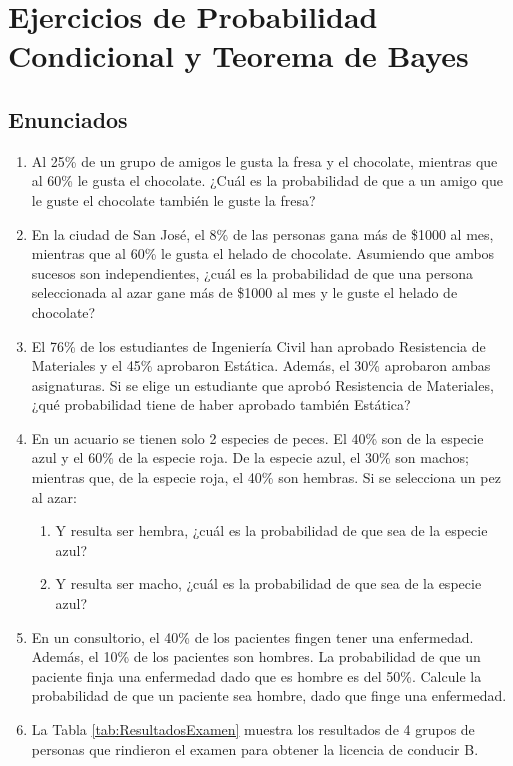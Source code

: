 \documentclass[12pt, letterpaper]{article}
\begin{document}
\newpage

\section{Ejercicios de Probabilidad Condicional y Teorema de Bayes}
\subsection{Enunciados}
\begin{enumerate}
	\item Al 25\% de un grupo de amigos le gusta la fresa y el chocolate, mientras que al 60\% le gusta el chocolate. ¿Cuál es la probabilidad de que a un amigo que le guste el chocolate también le guste la fresa?
	\item En la ciudad de San José, el 8\% de las personas gana más de \$1000 al mes, mientras que al 60\% le gusta el helado de chocolate. Asumiendo que ambos sucesos son independientes, ¿cuál es la probabilidad de que una persona seleccionada al azar gane más de \$1000 al mes y le guste el helado de chocolate?
	\item El 76\% de los estudiantes de Ingeniería Civil han aprobado Resistencia de Materiales y el 45\% aprobaron Estática. Además, el 30\% aprobaron ambas asignaturas. Si se elige un estudiante que aprobó Resistencia de Materiales, ¿qué probabilidad tiene de haber aprobado también Estática?
	\item En un acuario se tienen solo 2 especies de peces. El 40\% son de la especie azul y el 60\% de la especie roja. De la especie azul, el 30\% son machos; mientras que, de la especie roja, el 40\% son hembras. Si se selecciona un pez al azar:
	      \begin{enumerate}
		      \item Y resulta ser hembra, ¿cuál es la probabilidad de que sea de la especie azul?
		      \item Y resulta ser macho, ¿cuál es la probabilidad de que sea de la especie azul?
	      \end{enumerate}
	\item En un consultorio, el 40\% de los pacientes fingen tener una enfermedad. Además, el 10\% de los pacientes son hombres. La probabilidad de que un paciente finja una enfermedad dado que es hombre es del 50\%. Calcule la probabilidad de que un paciente sea hombre, dado que finge una enfermedad.
	\item La Tabla \ref{tab:ResultadosExamen} muestra los resultados de 4 grupos de personas que rindieron el examen para obtener la licencia de conducir B.

\end{enumerate}
\end{document}
